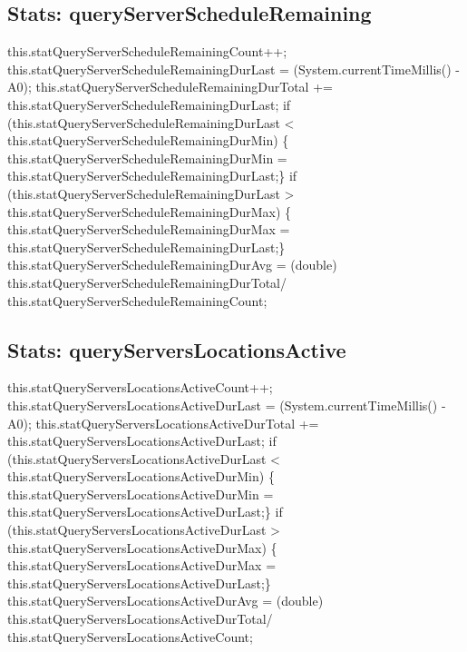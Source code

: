 \subsection{Stats: queryServerScheduleRemaining}
\nwenddocs{}\endmoddef{}
    this.statQueryServerScheduleRemainingCount++;
    this.statQueryServerScheduleRemainingDurLast = (System.currentTimeMillis() - A0);
    this.statQueryServerScheduleRemainingDurTotal +=
    this.statQueryServerScheduleRemainingDurLast;
if (this.statQueryServerScheduleRemainingDurLast <
    this.statQueryServerScheduleRemainingDurMin) \{
    this.statQueryServerScheduleRemainingDurMin =
    this.statQueryServerScheduleRemainingDurLast;\}
if (this.statQueryServerScheduleRemainingDurLast >
    this.statQueryServerScheduleRemainingDurMax) \{
    this.statQueryServerScheduleRemainingDurMax =
    this.statQueryServerScheduleRemainingDurLast;\}
    this.statQueryServerScheduleRemainingDurAvg = (double)
    this.statQueryServerScheduleRemainingDurTotal/
    this.statQueryServerScheduleRemainingCount;
\nwendcode{}\nwdocspar

\subsection{Stats: queryServersLocationsActive}
\nwenddocs{}\endmoddef{}
    this.statQueryServersLocationsActiveCount++;
    this.statQueryServersLocationsActiveDurLast = (System.currentTimeMillis() - A0);
    this.statQueryServersLocationsActiveDurTotal +=
    this.statQueryServersLocationsActiveDurLast;
if (this.statQueryServersLocationsActiveDurLast <
    this.statQueryServersLocationsActiveDurMin) \{
    this.statQueryServersLocationsActiveDurMin =
    this.statQueryServersLocationsActiveDurLast;\}
if (this.statQueryServersLocationsActiveDurLast >
    this.statQueryServersLocationsActiveDurMax) \{
    this.statQueryServersLocationsActiveDurMax =
    this.statQueryServersLocationsActiveDurLast;\}
    this.statQueryServersLocationsActiveDurAvg = (double)
    this.statQueryServersLocationsActiveDurTotal/
    this.statQueryServersLocationsActiveCount;
\nwendcode{}\nwdocspar

